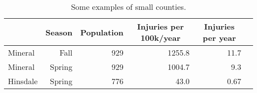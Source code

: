 \begin{table}[h!]
\centering
\begin{tabular}{|l|r|r|r|r|r|}
\hline
\rowcolor[HTML]{E7EAF6} 
\multicolumn{1}{|c|}{\textbf{County}} & \multicolumn{1}{c|}{\textbf{Season}} & \multicolumn{1}{c|}{\textbf{Population}} & \multicolumn{1}{c|}{\textbf{Injuries per 100k/year}} & \multicolumn{1}{c|}{\textbf{Injuries per year}} \\ \hline
Mineral & Fall & 929 & 1255.8 & 11.7 \\ \hline
Mineral & Spring & 929 & 1004.7 & 9.3 \\ \hline
Hinsdale & Spring & 776 & 43.0 & 0.67 \\ \hline
\end{tabular}
\caption{Some examples of small counties.}
\end{table}
